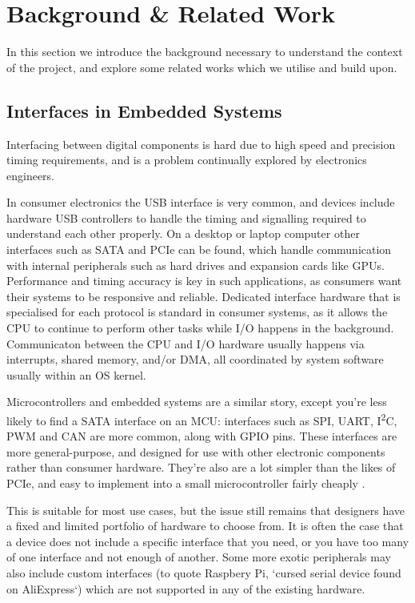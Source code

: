 \chapter{Background \& Related Work}
\label{ch:background}

In this section we introduce the background necessary to understand the context of the project, and explore some related works which we utilise and build upon.

\section{Interfaces in Embedded Systems}
\label{sec:embedded-interfaces}

Interfacing between digital components is hard due to high speed and precision timing requirements, and is a problem continually explored by electronics engineers.

In consumer electronics the USB interface is very common, and devices include hardware USB controllers to handle the timing and signalling required to understand each other properly. On a desktop or laptop computer other interfaces such as SATA and PCIe can be found, which handle communication with internal peripherals such as hard drives and expansion cards like GPUs. Performance and timing accuracy is key in such applications, as consumers want their systems to be responsive and reliable. Dedicated interface hardware that is specialised for each protocol is standard in consumer systems, as it allows the CPU to continue to perform other tasks while I/O happens in the background. Communicaton between the CPU and I/O hardware usually happens via interrupts, shared memory, and/or DMA, all coordinated by system software usually within an OS kernel.

Microcontrollers and embedded systems are a similar story, except you're less likely to find a SATA interface on an MCU: interfaces such as SPI, UART, I\textsuperscript{2}C, PWM and CAN are more common, along with GPIO pins. These interfaces are more general-purpose, and designed for use with other electronic components rather than consumer hardware. They're also are a lot simpler than the likes of PCIe, and easy to implement into a small microcontroller fairly cheaply \cite{rp2040}.

This is suitable for most use cases, but the issue still remains that designers have a fixed and limited portfolio of hardware to choose from. It is often the case that a device does not include a specific interface that you need, or you have too many of one interface and not enough of another. Some more exotic peripherals may also include custom interfaces (to quote Raspbery Pi, `cursed serial device found on AliExpress`) which are not supported in any of the existing hardware.

